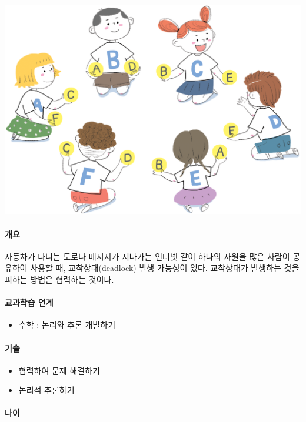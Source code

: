 \documentclass[]{article}
\begin{document}
\includegraphics{csunplugged/02-part/img/ch10-network/10-network-01-orange-game.png}

\mbox{}\paragraph{개요}\label{section-134}

자동차가 다니는 도로나 메시지가 지나가는 인터넷 같이 하나의 자원을 많은
사람이 공유하여 사용할 때, 교착상태(deadlock) 발생 가능성이 있다.
교착상태가 발생하는 것을 피하는 방법은 협력하는 것이다.

\mbox{}\paragraph{교과학습 연계}\label{section-135}

\begin{itemize}
\itemsep1pt\parskip0pt
\item
  수학 : 논리와 추론 개발하기
\end{itemize}

\mbox{}\paragraph{기술}\label{section-136}

\begin{itemize}
\itemsep1pt\parskip0pt
\item
  협력하여 문제 해결하기
\item
  논리적 추론하기
\end{itemize}

\mbox{}\paragraph{나이}\label{section-137}
\end{document}
